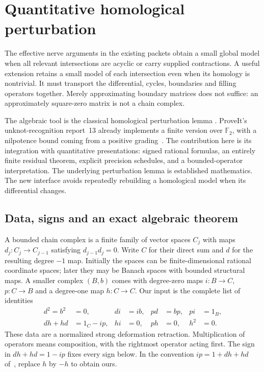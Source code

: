 \section{Quantitative homological perturbation}
\label{sec:homological}

The effective nerve arguments in the existing packets obtain a small global
model when all relevant intersections are acyclic or carry supplied
contractions.  A useful extension retains a small model of each intersection
even when its homology is nontrivial.  It must transport the differential,
cycles, boundaries and filling operators together.  Merely approximating
boundary matrices does not suffice: an approximately square-zero matrix is
not a chain complex.

The algebraic tool is the classical homological perturbation lemma
\cite{crainic2004}.  ProveIt's unknot-recognition report~13 already implements
a finite version over $\mathbb F_2$, with a nilpotence bound coming from a
positive grading~\cite{repo_hpl}.  The contribution here is its integration
with quantitative presentations: signed rational formulas, an entirely
finite residual theorem, explicit precision schedules, and a bounded-operator
interpretation.  The underlying perturbation lemma is established
mathematics.  The new interface avoids repeatedly rebuilding a homological
model when its differential changes.

\subsection{Data, signs and an exact algebraic theorem}

A bounded chain complex is a finite family of vector spaces $C_j$ with maps
$d_j:C_j\to C_{j-1}$ satisfying $d_{j-1}d_j=0$.  Write $C$ for their direct
sum and $d$ for the resulting degree $-1$ map.  Initially the spaces can be
finite-dimensional rational coordinate spaces; later they may be Banach
spaces with bounded structural maps.  A smaller complex $(B,b)$ comes with
degree-zero maps $i:B\to C$, $p:C\to B$ and a degree-one map $h:C\to C$.
Our input is the complete list of identities
\begin{align}
 d^2=b^2&=0,& di&=ib,& pd&=bp,& pi&=1_B,\\
 dh+hd&=1_C-ip,& hi&=0,& ph&=0,& h^2&=0.
 \label{eq:hpl-input}
\end{align}
These data are a normalized strong deformation retraction.  Multiplication
of operators means composition, with the rightmost operator acting first.
The sign in $dh+hd=1-ip$ fixes every sign below.  In the convention
$ip=1+dh+hd$ of~\cite{crainic2004}, replace $h$ by $-h$ to obtain ours.

